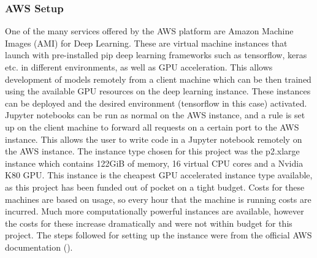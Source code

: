 \documentclass[12pt]{report}
\begin{document}
\subsubsection{AWS Setup}
\begin{flushleft}
One of the many services offered by the AWS platform are Amazon Machine Images (AMI) for Deep Learning. These are virtual machine instances that launch with pre-installed pip deep learning frameworks such as tensorflow, keras etc. in different environments, as well as GPU acceleration. This allows development of models remotely from a client machine which can be then trained using the available GPU resources on the deep learning instance. These instances can be deployed and the desired environment (tensorflow in this case) activated. Jupyter notebooks can be run as normal on the AWS instance, and a rule is set up on the client machine to forward all requests on a certain port to the AWS instance. This allows the user to write code in a Jupyter notebook remotely on the AWS instance. The instance type chosen for this project was the p2.xlarge instance which contains 122GiB of memory, 16 virtual CPU cores and a Nvidia K80 GPU. This instance is the cheapest GPU accelerated instance type available, as this project has been funded out of pocket on a tight budget. Costs for these machines are based on usage, so every hour that the machine is running costs are incurred. Much more computationally powerful instances are available, however the costs for these increase dramatically and were not within budget for this project. The steps followed for setting up the instance were from the official AWS documentation (\cite{aws}).
\end{flushleft}
\end{document}
